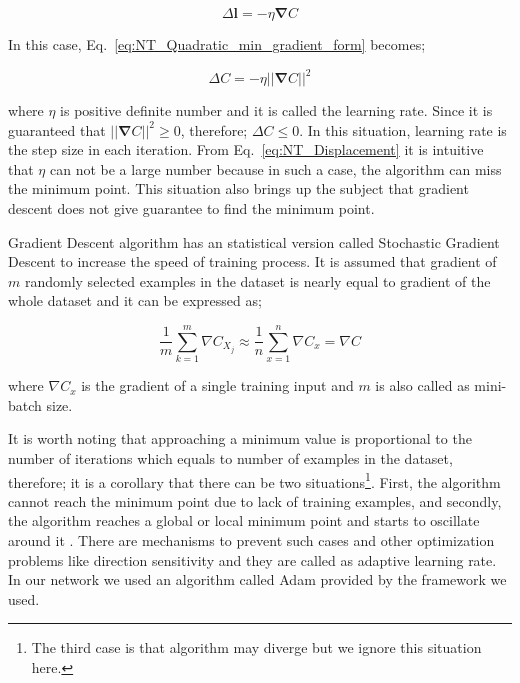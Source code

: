 \documentclass[a4paper,times,hidelinks,12pt]{article}
\begin{document}
\begin{equation}
\label{eq:NT_learning_rate}
\Delta{\boldsymbol{l}} = -\eta\boldsymbol{\nabla}C
\end{equation}

\noindent In this case, Eq.~\eqref{eq:NT_Quadratic_min_gradient_form} becomes;

\begin{equation}
\label{eq:NT_Displacement}
\Delta{C} = -\eta ||\boldsymbol{\nabla}{C}||^2
\end{equation}

\noindent where $\eta$ is positive definite number and it is called the learning rate. Since it is guaranteed that $||\boldsymbol{\nabla}{C}||^2 \geq 0$, therefore; $\Delta{C} \leq 0$. In this situation, learning rate is the step size in each iteration. From Eq.~\eqref{eq:NT_Displacement} it is intuitive that $\eta$ can not be a large number because in such a case, the algorithm can miss the minimum point. This situation also brings up the subject that gradient descent does not give guarantee to find the minimum point.

Gradient Descent algorithm has an statistical version called Stochastic Gradient Descent to increase the speed of training process. It is assumed that gradient of  $m$ randomly selected examples in the dataset is nearly equal to gradient of the whole dataset and it can be expressed as;

\begin{equation}
\label{eq:NT_Stochastic}
\frac{1}{m} \sum\limits_{k = 1}^{m} \nabla{C_{X_j}} \approx \frac{1}{n}\sum\limits_{x = 1}^{n} \nabla{C_{x}} = \nabla{C}
\end{equation}

\noindent where $\nabla{C_x}$ is the gradient of a single training input and $m$ is also called as mini-batch size.

It is worth noting that approaching a minimum value is proportional to the number of iterations which equals to number of examples in the dataset, therefore; it is a corollary that there can be two situations\footnote{The third case is that algorithm may diverge but we ignore this situation here.}. First, the algorithm cannot reach the minimum point due to lack of training examples, and secondly, the algorithm reaches a global or local minimum point and starts to oscillate around it \cite{zeiler2012adadelta}. There are mechanisms to prevent such cases and other optimization problems like direction sensitivity and they are called as adaptive learning rate. In our network we used an algorithm called Adam \cite{kingma2014adam} provided by the framework we used.  
\end{document}
